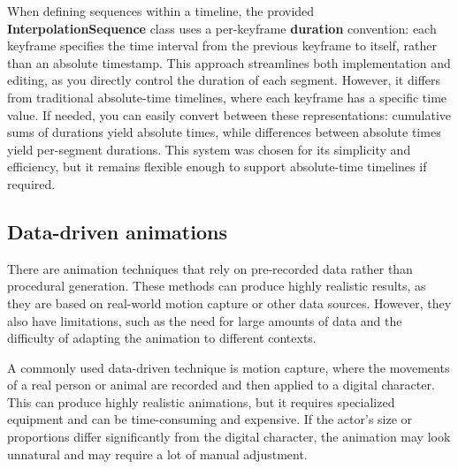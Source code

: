 \pagebreak

\begin{Note}
    When defining sequences within a timeline, the provided \textbf{InterpolationSequence} class uses a per-keyframe \textbf{duration} convention: each keyframe specifies the time interval from the previous keyframe to itself, rather than an absolute timestamp. This approach streamlines both implementation and editing, as you directly control the duration of each segment. However, it differs from traditional absolute-time timelines, where each keyframe has a specific time value. If needed, you can easily convert between these representations: cumulative sums of durations yield absolute times, while differences between absolute times yield per-segment durations. This system was chosen for its simplicity and efficiency, but it remains flexible enough to support absolute-time timelines if required.
\end{Note}


\vspace{90pt}

\subsection{Data-driven animations}
\label{subsec:data-driven-animations}

There are animation techniques that rely on pre-recorded data rather than procedural generation. These methods can produce highly realistic results, as they are based on real-world motion capture or other data sources. However, they also have limitations, such as the need for large amounts of data and the difficulty of adapting the animation to different contexts.

A commonly used data-driven technique is motion capture, where the movements of a real person or animal are recorded and then applied to a digital character. This can produce highly realistic animations, but it requires specialized equipment and can be time-consuming and expensive. If the actor's size or proportions differ significantly from the digital character, the animation may look unnatural and may require a lot of manual adjustment.

\pagebreak

